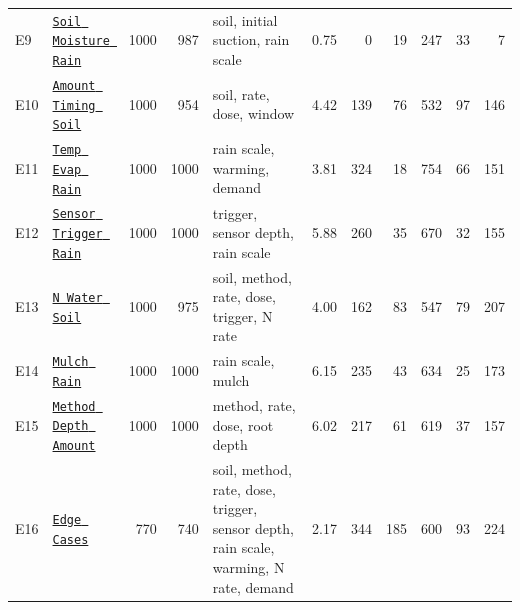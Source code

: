 \begin{table}[H]
\begin{tabular}{@{}llrrp{3.5cm}rrrrrr@{}}
E9 & \href{\repourl/blob/main/Data/Comprehensive_Summary/E09_Soil_Moisture_Rain.csv.gz}{\texttt{Soil Moisture Rain}} & 1000 & 987 & soil, initial suction, rain scale & 0.75 & 0 & 19 & 247 & 33 & 7\\
E10 & \href{\repourl/blob/main/Data/Comprehensive_Summary/E10_Amount_Timing_Soil.csv.gz}{\texttt{Amount Timing Soil}} & 1000 & 954 & soil, rate, dose, window & 4.42 & 139 & 76 & 532 & 97 & 146\\
E11 & \href{\repourl/blob/main/Data/Comprehensive_Summary/E11_Temp_Evap_Rain.csv.gz}{\texttt{Temp Evap Rain}} & 1000 & 1000 & rain scale, warming, demand & 3.81 & 324 & 18 & 754 & 66 & 151\\
E12 & \href{\repourl/blob/main/Data/Comprehensive_Summary/E12_Sensor_Trigger_Rain.csv.gz}{\texttt{Sensor Trigger Rain}} & 1000 & 1000 & trigger, sensor depth, rain scale & 5.88 & 260 & 35 & 670 & 32 & 155\\
E13 & \href{\repourl/blob/main/Data/Comprehensive_Summary/E13_N_Water_Soil.csv.gz}{\texttt{N Water Soil}} & 1000 & 975 & soil, method, rate, dose, trigger, N rate & 4.00 & 162 & 83 & 547 & 79 & 207\\
E14 & \href{\repourl/blob/main/Data/Comprehensive_Summary/E14_Mulch_Rain.csv.gz}{\texttt{Mulch Rain}} & 1000 & 1000 & rain scale, mulch & 6.15 & 235 & 43 & 634 & 25 & 173\\
E15 & \href{\repourl/blob/main/Data/Comprehensive_Summary/E15_Method_Depth_Amount.csv.gz}{\texttt{Method Depth Amount}} & 1000 & 1000 & method, rate, dose, root depth & 6.02 & 217 & 61 & 619 & 37 & 157\\
E16 & \href{\repourl/blob/main/Data/Comprehensive_Summary/E16_Edge_Cases.csv.gz}{\texttt{Edge Cases}} & 770 & 740 & soil, method, rate, dose, trigger, sensor depth, rain scale, warming, N rate, demand & 2.17 & 344 & 185 & 600 & 93 & 224\\
\bottomrule
\end{tabular}
\end{table}
